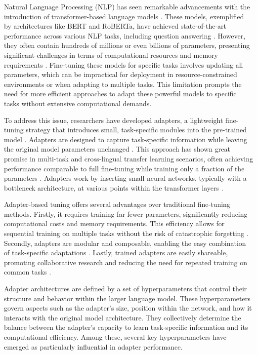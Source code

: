 \documentclass[conference]{IEEEtran}
\begin{document}
Natural Language Processing (NLP) has seen remarkable advancements with the introduction of transformer-based language models \cite{b1} \cite{b2}. These models, exemplified by architectures like BERT and RoBERTa, have achieved state-of-the-art performance across various NLP tasks, including question answering \cite{b3,b4}. However, they often contain hundreds of millions or even billions of parameters, presenting significant challenges in terms of computational resources and memory requirements \cite{b5}. Fine-tuning these models for specific tasks involves updating all parameters, which can be impractical for deployment in resource-constrained environments or when adapting to multiple tasks. This limitation prompts the need for more efficient approaches to adapt these powerful models to specific tasks without extensive computational demands.

To address this issue, researchers have developed adapters, a lightweight fine-tuning strategy that introduces small, task-specific modules into the pre-trained model \cite{b6}. Adapters are designed to capture task-specific information while leaving the original model parameters unchanged \cite{b6,b7}. This approach has shown great promise in multi-task and cross-lingual transfer learning scenarios, often achieving performance comparable to full fine-tuning while training only a fraction of the parameters \cite{b3,b7}. Adapters work by inserting small neural networks, typically with a bottleneck architecture, at various points within the transformer layers \cite{b7}.

Adapter-based tuning offers several advantages over traditional fine-tuning methods. Firstly, it requires training far fewer parameters, significantly reducing computational costs and memory requirements\cite{b3,b8}. This efficiency allows for sequential training on multiple tasks without the risk of catastrophic forgetting \cite{b8}. Secondly, adapters are modular and composable, enabling the easy combination of task-specific adaptations \cite{b7,b8}. Lastly, trained adapters are easily shareable, promoting collaborative research and reducing the need for repeated training on common tasks \cite{b7}.

Adapter architectures are defined by a set of hyperparameters that control their structure and behavior within the larger language model\cite{b9,b10}. These hyperparameters govern aspects such as the adapter's size, position within the network, and how it interacts with the original model architecture. They collectively determine the balance between the adapter's capacity to learn task-specific information and its computational efficiency. Among these, several key hyperparameters have emerged as particularly influential in adapter performance.
\end{document}
